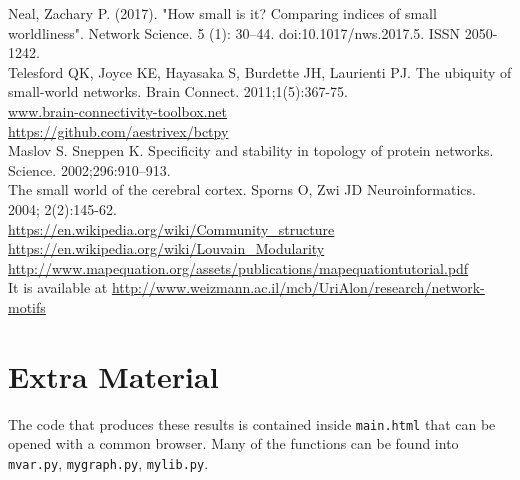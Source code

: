 \documentclass[%
 aip,
 jmp,%
 amsmath,amssymb,
 reprint,%
]{revtex4-1}
\begin{document}
\begin{thebibliography}{}
	Neal, Zachary P. (2017). "How small is it? Comparing indices of small worldliness". Network Science. 5 (1): 30–44. doi:10.1017/nws.2017.5. ISSN 2050-1242.\\
	
	Telesford QK, Joyce KE, Hayasaka S, Burdette JH, Laurienti PJ. The ubiquity of small-world networks. Brain Connect. 2011;1(5):367-75.\\
	
	\url{www.brain-connectivity-toolbox.net}\\
	
	\url{https://github.com/aestrivex/bctpy}\\
	
	Maslov S. Sneppen K. Specificity and stability in topology of protein networks. Science. 2002;296:910–913.\\
	
	The small world of the cerebral cortex.
	Sporns O, Zwi JD
	Neuroinformatics. 2004; 2(2):145-62.\\
	
	\url{https://en.wikipedia.org/wiki/Community_structure}\\
	 
	\url{https://en.wikipedia.org/wiki/Louvain_Modularity}\\
	 
	\url{http://www.mapequation.org/assets/publications/mapequationtutorial.pdf}\\
	
	It is available at \url{http://www.weizmann.ac.il/mcb/UriAlon/research/network-motifs}\\
	
	
\end{thebibliography}


\appendix


\section{\label{sec:level1}Extra Material}

The code that produces these results is contained inside \verb|main.html| that can be opened with a common browser. Many of the functions can be found into \verb|mvar.py|, \verb|mygraph.py|, \verb|mylib.py|.
\end{document}
